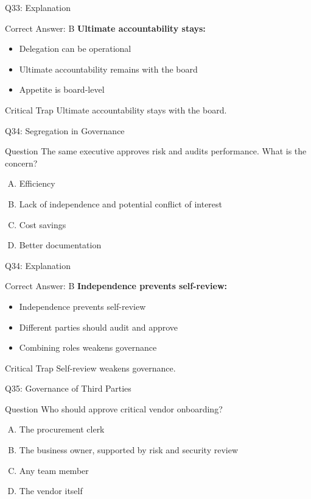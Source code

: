 \documentclass{beamer}
\begin{document}
	\begin{frame}{Q33: Explanation}
		\begin{block}{Correct Answer: B}
			\textbf{Ultimate accountability stays:}
			\begin{itemize}
				\item Delegation can be operational
				\item Ultimate accountability remains with the board
				\item Appetite is board-level
			\end{itemize}
		\end{block}
		\begin{alertblock}{Critical Trap}
			Ultimate accountability stays with the board.
		\end{alertblock}
	\end{frame}
	
	\begin{frame}{Q34: Segregation in Governance}
		\begin{block}{Question}
			The same executive approves risk and audits performance. What is the concern?
		\end{block}
		\begin{enumerate}[(A)]
			\item Efficiency
			\item Lack of independence and potential conflict of interest
			\item Cost savings
			\item Better documentation
		\end{enumerate}
	\end{frame}
	
	\begin{frame}{Q34: Explanation}
		\begin{block}{Correct Answer: B}
			\textbf{Independence prevents self-review:}
			\begin{itemize}
				\item Independence prevents self-review
				\item Different parties should audit and approve
				\item Combining roles weakens governance
			\end{itemize}
		\end{block}
		\begin{alertblock}{Critical Trap}
			Self-review weakens governance.
		\end{alertblock}
	\end{frame}
	
	\begin{frame}{Q35: Governance of Third Parties}
		\begin{block}{Question}
			Who should approve critical vendor onboarding?
		\end{block}
		\begin{enumerate}[(A)]
			\item The procurement clerk
			\item The business owner, supported by risk and security review
			\item Any team member
			\item The vendor itself
		\end{enumerate}
	\end{frame}
	
\end{document}
